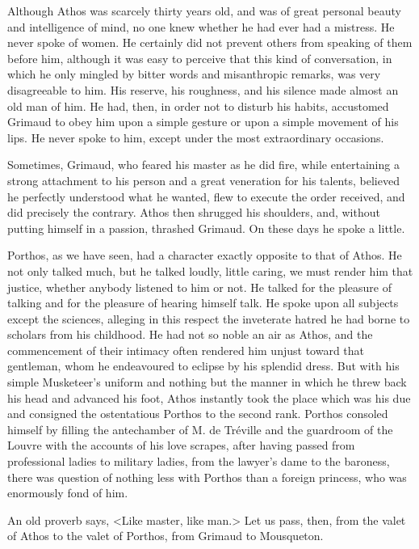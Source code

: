 Although Athos was scarcely thirty years old, and was of great personal beauty and intelligence of mind, no one knew whether he had ever had a mistress. He never spoke of women. He certainly did not prevent others from speaking of them before him, although it was easy to perceive that this kind of conversation, in which he only mingled by bitter words and misanthropic remarks, was very disagreeable to him. His reserve, his roughness, and his silence made almost an old man of him. He had, then, in order not to disturb his habits, accustomed Grimaud to obey him upon a simple gesture or upon a simple movement of his lips. He never spoke to him, except under the most extraordinary occasions. 

Sometimes, Grimaud, who feared his master as he did fire, while entertaining a strong attachment to his person and a great veneration for his talents, believed he perfectly understood what he wanted, flew to execute the order received, and did precisely the contrary. Athos then shrugged his shoulders, and, without putting himself in a passion, thrashed Grimaud. On these days he spoke a little. 

Porthos, as we have seen, had a character exactly opposite to that of Athos. He not only talked much, but he talked loudly, little caring, we must render him that justice, whether anybody listened to him or not. He talked for the pleasure of talking and for the pleasure of hearing himself talk. He spoke upon all subjects except the sciences, alleging in this respect the inveterate hatred he had borne to scholars from his childhood. He had not so noble an air as Athos, and the commencement of their intimacy often rendered him unjust toward that gentleman, whom he endeavoured to eclipse by his splendid dress. But with his simple Musketeer's uniform and nothing but the manner in which he threw back his head and advanced his foot, Athos instantly took the place which was his due and consigned the ostentatious Porthos to the second rank. Porthos consoled himself by filling the antechamber of M. de Tréville and the guardroom of the Louvre with the accounts of his love scrapes, after having passed from professional ladies to military ladies, from the lawyer's dame to the baroness, there was question of nothing less with Porthos than a foreign princess, who was enormously fond of him. 

An old proverb says, <Like master, like man.> Let us pass, then, from the valet of Athos to the valet of Porthos, from Grimaud to Mousqueton. 

